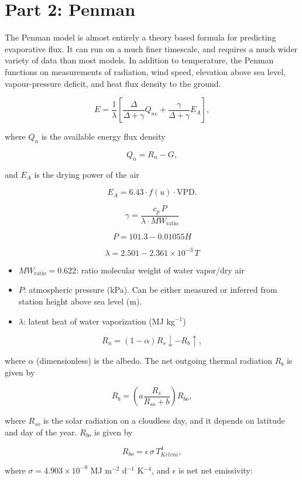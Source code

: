 \documentclass[
  letterpaper,
  DIV=11,
  numbers=noendperiod]{scrreprt}
\providecommand{\tightlist}{%
  \setlength{\itemsep}{0pt}\setlength{\parskip}{0pt}}\usepackage{longtable,booktabs,array}
\begin{document}
\hypertarget{part-2-penman}{%
\section{Part 2: Penman}\label{part-2-penman}}

The Penman model is almost entirely a theory based formula for
predicting evaporative flux. It can run on a much finer timescale, and
requires a much wider variety of data than most models. In addition to
temperature, the Penman functions on measurements of radiation, wind
speed, elevation above sea level, vapour-pressure deficit, and heat flux
density to the ground.

\[
E = \frac{1}{\lambda}\left[ \frac{\Delta}{\Delta+\gamma}Q_{ne}+ \frac{\gamma}{\Delta+\gamma}E_A \right],
\]

where \(Q_n\) is the available energy flux density

\[
Q_n = R_n - G,
\]

and \(E_A\) is the drying power of the air

\[
E_A = 6.43\cdot f(u)\cdot\text{VPD}.
\]

\[
\gamma = \frac{c_p\, P}{\lambda\cdot MW_\text{ratio}}
\]

\[
P = 101.3-0.01055 H
\]

\[
\lambda = 2.501 - 2.361\times 10^{-3}\,T
\]

\begin{itemize}
\tightlist
\item
  \(MW_\text{ratio}=0.622\): ratio molecular weight of water vapor/dry
  air
\item
  \(P\): atmospheric pressure (kPa). Can be either measured or inferred
  from station height above sea level (m).
\item
  \(\lambda\): latent heat of water vaporization (MJ kg\(^{-1}\))
\end{itemize}

\[
R_n = (1-\alpha)R_s\!\! \downarrow -R_b \!\! \uparrow,
\]

where \(\alpha\) (dimensionless) is the albedo. The net outgoing thermal
radiation \(R_b\) is given by

\[
R_b = \left( a\frac{R_s}{R_{so}+b} \right)R_{bo},
\]

where \(R_{so}\) is the solar radiation on a cloudless day, and it
depends on latitude and day of the year. \(R_{bo}\) is given by

\[
R_{bo} = \epsilon\, \sigma\, T^4_{Kelvin},
\]

where \(\sigma=4.903\times 10^{-9}\) MJ m\(^{-2}\) d\(^{-1}\)
K\(^{-4}\), and \(\epsilon\) is net net emissivity:
\end{document}
